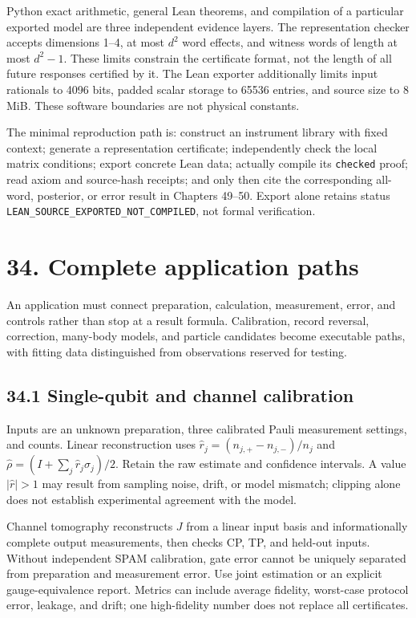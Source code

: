 \documentclass[
  11pt,
  oneside]{book}
\begin{document}
Python exact arithmetic, general Lean theorems, and compilation of a
particular exported model are three independent evidence layers. The
representation checker accepts dimensions 1--4, at most \(d^2\) word
effects, and witness words of length at most \(d^2-1\). These limits
constrain the certificate format, not the length of all future responses
certified by it. The Lean exporter additionally limits input rationals
to 4096 bits, padded scalar storage to 65536 entries, and source size to
8 MiB. These software boundaries are not physical constants.

The minimal reproduction path is: construct an instrument library with
fixed context; generate a representation certificate; independently
check the local matrix conditions; export concrete Lean data; actually
compile its \texttt{checked} proof; read axiom and source-hash receipts;
and only then cite the corresponding all-word, posterior, or error
result in Chapters 49--50. Export alone retains status
\texttt{LEAN\_\allowbreak SOURCE\_\allowbreak EXPORTED\_\allowbreak NOT\_\allowbreak COMPILED}, not formal verification.

\chapter{34. Complete application paths}\label{ch-34}

An application must connect preparation, calculation, measurement,
error, and controls rather than stop at a result formula. Calibration,
record reversal, correction, many-body models, and particle candidates
become executable paths, with fitting data distinguished from
observations reserved for testing.

\section{34.1 Single-qubit and channel calibration}

Inputs are an unknown preparation, three calibrated Pauli measurement
settings, and counts. Linear reconstruction uses
\(\hat r_j=(n_{j,+}-n_{j,-})/n_j\) and
\(\hat\rho=(I+\sum_j\hat r_j\sigma_j)/2\). Retain the raw estimate and
confidence intervals. A value \(|\hat r|>1\) may result from sampling
noise, drift, or model mismatch; clipping alone does not establish
experimental agreement with the model.

Channel tomography reconstructs \(J\) from a linear input basis and
informationally complete output measurements, then checks CP, TP, and
held-out inputs. Without independent SPAM calibration, gate error cannot
be uniquely separated from preparation and measurement error. Use joint
estimation or an explicit gauge-equivalence report. Metrics can include
average fidelity, worst-case protocol error, leakage, and drift; one
high-fidelity number does not replace all certificates.
\end{document}
